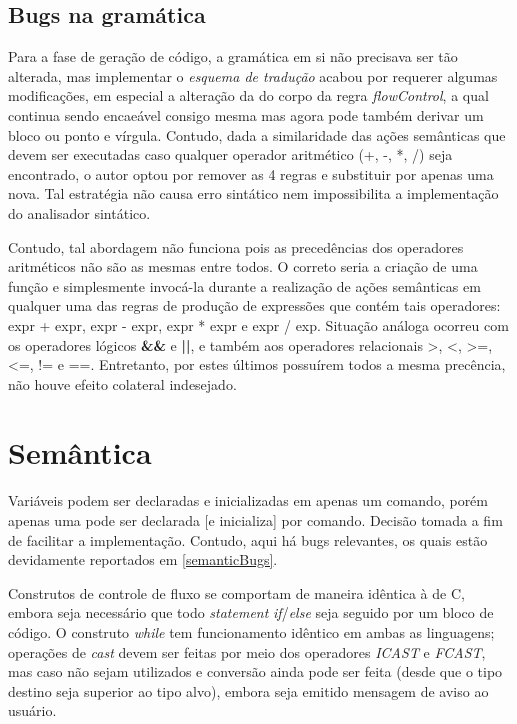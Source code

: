 \documentclass[
	article,			%
	11pt,				%
	oneside,			%
	a4paper,			%
	english,			%
	brazil,				%
	sumario=tradicional
	]{abntex2}
\renewcommand{\it}[1]{\textit{#1}}
\renewcommand{\bf}[1]{\textbf{#1}}
\begin{document}
\subsection{Bugs na gramática}
\label{grammarBugs}
Para a fase de geração de código, a gramática em si não precisava ser tão alterada, mas implementar o \it{esquema de tradução} acabou por requerer algumas modificações, em especial a alteração da do corpo da regra \it{flowControl}, a qual continua sendo encaeável consigo mesma mas agora pode também derivar um bloco ou ponto e vírgula. Contudo, dada a similaridade das ações semânticas que devem ser executadas caso qualquer operador aritmético (+, -, *, /) seja encontrado, o autor optou por remover as 4 regras e substituir por apenas uma nova. Tal estratégia não causa erro sintático nem impossibilita a implementação do analisador sintático.

Contudo, tal abordagem não funciona pois as precedências dos operadores aritméticos não são as mesmas entre todos. O correto seria a criação de uma função e simplesmente invocá-la durante a realização de ações semânticas em qualquer uma das regras de produção de expressões que contém tais operadores: expr + expr, expr - expr, expr * expr e expr / exp. Situação análoga ocorreu com os operadores lógicos \bf{\&\&} e \bf{||}, e também aos operadores relacionais >, <, >=, <=, != e ==. Entretanto, por estes últimos possuírem todos a mesma precência, não houve efeito colateral indesejado.






\section{Semântica}

Variáveis podem ser declaradas e inicializadas em apenas um comando, porém apenas uma pode ser declarada [e inicializa] por comando. Decisão tomada a fim de facilitar a implementação. Contudo, aqui há bugs relevantes, os quais estão devidamente reportados em \ref{semanticBugs}.

Construtos de controle de fluxo se comportam de maneira idêntica à de C, embora seja necessário que todo \it{statement} \it{if}/\it{else} seja seguido por um bloco de código. O construto \it{while} tem funcionamento idêntico em ambas as linguagens; operações de \it{cast} devem ser feitas por meio dos operadores \it{ICAST} e \it{FCAST}, mas caso não sejam utilizados e conversão ainda pode ser feita (desde que o tipo destino seja superior ao tipo alvo), embora seja emitido mensagem de aviso ao usuário.
\end{document}
